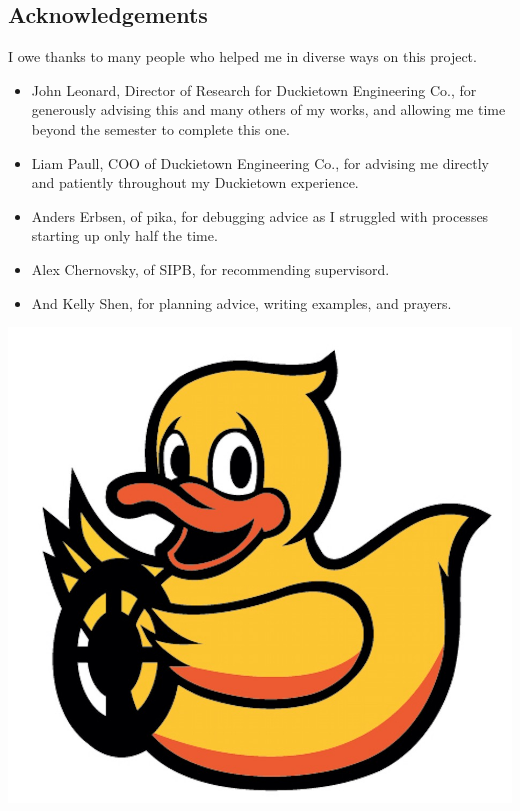 \documentclass[titlepage]{article}
\begin{document}
\subsection{Acknowledgements}
I owe thanks to many people who helped me in diverse ways on this project. 
\begin{itemize}
\item John Leonard, Director of Research for Duckietown Engineering Co., for generously advising this and many others of my works, and allowing me time beyond the semester to complete this one.
\item Liam Paull, COO of Duckietown Engineering Co., for advising me directly and patiently throughout my Duckietown experience. 
\item Anders Erbsen, of pika, for debugging advice as I struggled with processes starting up only half the time.
\item Alex Chernovsky, of SIPB, for recommending supervisord.
\item And Kelly Shen, for planning advice, writing examples, and prayers. 
\end{itemize}

\begin{center}
\vspace{1.5 em}
\includegraphics[scale=.18]{mack.jpg}
\end{center}
\end{document}
